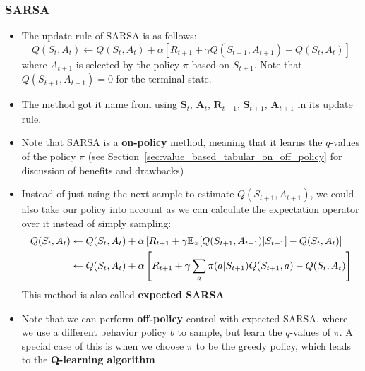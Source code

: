 \subsubsection{SARSA}
\begin{itemize}
	\item The update rule of SARSA is as follows:
	$$Q(S_t,A_t)\leftarrow Q(S_t,A_t) + \alpha\left[R_{t+1}+\gamma Q(S_{t+1},A_{t+1})-Q(S_t,A_t)\right]$$
	where $A_{t+1}$ is selected by the policy $\pi$ based on $S_{t+1}$. Note that $Q(S_{t+1},A_{t+1})=0$ for the terminal state.
	\item The method got it name from using $\bm{S}_t$, $\bm{A}_t$, $\bm{R}_{t+1}$, $\bm{S}_{t+1}$, $\bm{A}_{t+1}$ in its update rule.
	\item Note that SARSA is a \textbf{on-policy} method, meaning that it learns the $q$-values of the policy $\pi$ (see Section~\ref{sec:value_based_tabular_on_off_policy} for discussion of benefits and drawbacks)
	\item Instead of just using the next sample to estimate $Q(S_{t+1},A_{t+1})$, we could also take our policy into account as we can calculate the expectation operator over it instead of simply sampling:
	\begin{equation*}
		\begin{split}
			Q(S_t,A_t) & \leftarrow Q(S_t,A_t) + \alpha\left[R_{t+1}+\gamma \mathbb{E}_{\pi}[Q(S_{t+1},A_{t+1})|S_{t+1}]-Q(S_t,A_t)\right]\\
			& \leftarrow Q(S_t,A_t) + \alpha\left[R_{t+1}+\gamma \sum_{a} \pi(a|S_{t+1}) Q(S_{t+1},a)-Q(S_t,A_t)\right]
		\end{split}
	\end{equation*}
	This method is also called \textbf{expected SARSA}
	\item Note that we can perform \textbf{off-policy} control with expected SARSA, where we use a different behavior policy $b$ to sample, but learn the $q$-values of $\pi$. A special case of this is when we choose $\pi$ to be the greedy policy, which leads to the \textbf{Q-learning algorithm}
\end{itemize}

